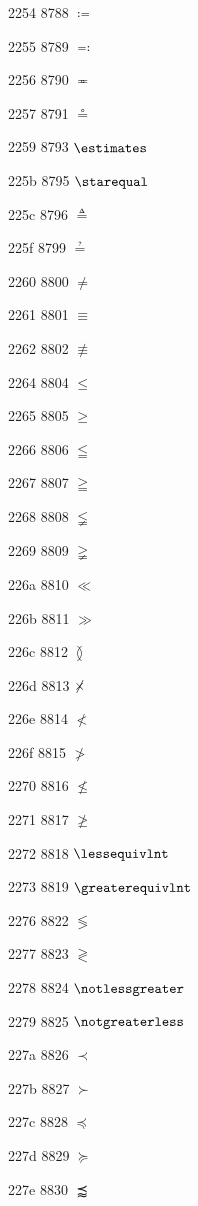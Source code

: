 \documentclass[11pt]{article}
\begin{document}
2254 8788 \ensuremath{\coloneq}

2255 8789 \ensuremath{\eqcolon}

2256 8790 \ensuremath{\eqcirc}

2257 8791 \ensuremath{\circeq}

2259 8793 \ensuremath{\estimates}

225b 8795 \ensuremath{\starequal}

225c 8796 \ensuremath{\triangleq}

225f 8799 \ensuremath{\questeq}

2260 8800 \ensuremath{\ne}

2261 8801 \ensuremath{\equiv}

2262 8802 \ensuremath{\nequiv}

2264 8804 \ensuremath{\leq}

2265 8805 \ensuremath{\geq}

2266 8806 \ensuremath{\leqq}

2267 8807 \ensuremath{\geqq}

2268 8808 \ensuremath{\lneqq}

2269 8809 \ensuremath{\gneqq}

226a 8810 \ensuremath{\ll}

226b 8811 \ensuremath{\gg}

226c 8812 \ensuremath{\between}

226d 8813 \ensuremath{\not\kern-0.3em\times}

226e 8814 \ensuremath{\nless}

226f 8815 \ensuremath{\ngtr}

2270 8816 \ensuremath{\nleq}

2271 8817 \ensuremath{\ngeq}

2272 8818 \ensuremath{\lessequivlnt}

2273 8819 \ensuremath{\greaterequivlnt}

2276 8822 \ensuremath{\lessgtr}

2277 8823 \ensuremath{\gtrless}

2278 8824 \ensuremath{\notlessgreater}

2279 8825 \ensuremath{\notgreaterless}

227a 8826 \ensuremath{\prec}

227b 8827 \ensuremath{\succ}

227c 8828 \ensuremath{\preccurlyeq}

227d 8829 \ensuremath{\succcurlyeq}

227e 8830 \ensuremath{\precapprox}
\end{document}
